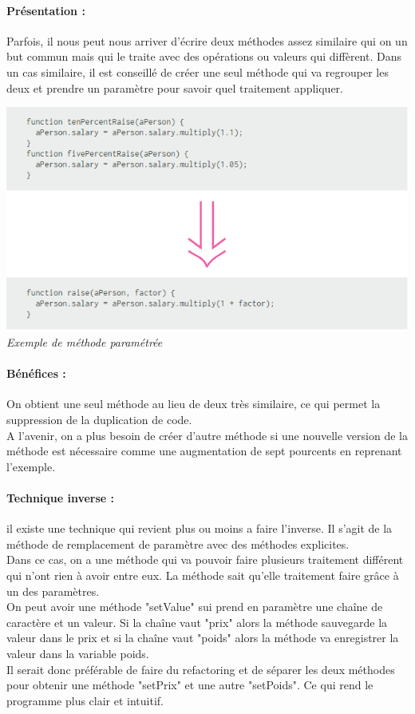 \documentclass[a4paper,twoside,12pt,openright]{report}
\begin{document}
\paragraph{Présentation :}
Parfois, il nous peut nous arriver d'écrire deux méthodes assez similaire qui on un but commun mais qui le traite avec des opérations ou valeurs qui diffèrent. Dans un cas similaire, il est conseillé de créer une seul méthode qui va regrouper les deux et prendre un paramètre pour savoir quel traitement appliquer.\\

\begin{center}
\includegraphics[scale=1]{Image/Methode_Parametre.png}\\
\itshape{Exemple de méthode paramétrée \cite{ref8}}
\end{center}

\paragraph{Bénéfices :}
On obtient une seul méthode au lieu de deux très similaire, ce qui permet la suppression de la duplication de code.\\
A l'avenir, on a plus besoin de créer d'autre méthode si une nouvelle version de la méthode est nécessaire comme une augmentation de sept pourcents en reprenant l'exemple.\\

\paragraph{Technique inverse :}
il existe une technique qui revient plus ou moins a faire l'inverse. Il s'agit de la méthode de remplacement de paramètre avec des méthodes explicites.\\
Dans ce cas, on a une méthode qui va pouvoir faire plusieurs traitement différent qui n'ont rien à avoir entre eux. La méthode sait qu'elle traitement faire grâce à un des paramètres.\\
On peut avoir une méthode "setValue" sui prend en paramètre une chaîne de caractère et un valeur. Si la chaîne vaut "prix" alors la méthode sauvegarde la valeur dans le prix et si la chaîne vaut "poids" alors la méthode va enregistrer la valeur dans la variable poids.\\
Il serait donc préférable de faire du refactoring et de séparer les deux méthodes pour obtenir une méthode "setPrix" et une autre "setPoids". Ce qui rend le programme plus clair et intuitif.\\
\end{document}
